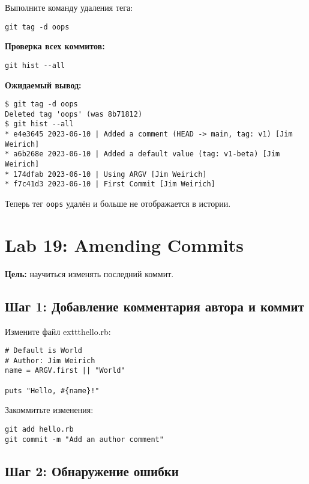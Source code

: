 \documentclass[a4paper,12pt]{report}
\begin{document}
Выполните команду удаления тега:
\begin{verbatim}
git tag -d oops
\end{verbatim}

\textbf{Проверка всех коммитов:}

\begin{verbatim}
git hist --all
\end{verbatim}

\textbf{Ожидаемый вывод:}
\begin{verbatim}
$ git tag -d oops
Deleted tag 'oops' (was 8b71812)
$ git hist --all
* e4e3645 2023-06-10 | Added a comment (HEAD -> main, tag: v1) [Jim Weirich]
* a6b268e 2023-06-10 | Added a default value (tag: v1-beta) [Jim Weirich]
* 174dfab 2023-06-10 | Using ARGV [Jim Weirich]
* f7c41d3 2023-06-10 | First Commit [Jim Weirich]
\end{verbatim}

Теперь тег \texttt{oops} удалён и больше не отображается в истории.


\section{Lab 19: Amending Commits}

\textbf{Цель:} научиться изменять последний коммит.

\subsection*{Шаг 1: Добавление комментария автора и коммит}

Измените файл 	exttt{hello.rb}:
\begin{verbatim}
# Default is World
# Author: Jim Weirich
name = ARGV.first || "World"

puts "Hello, #{name}!"
\end{verbatim}

Закоммитьте изменения:
\begin{verbatim}
git add hello.rb
git commit -m "Add an author comment"
\end{verbatim}

\subsection*{Шаг 2: Обнаружение ошибки}
\end{document}
